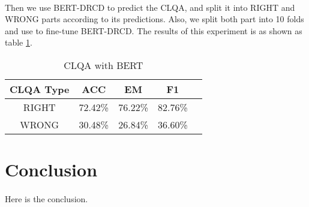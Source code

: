 \documentclass{article}
\begin{document}
\paragraph{}
Then we use BERT-DRCD to predict the CLQA, and split it into RIGHT and WRONG parts according to its predictions. Also, we split both part into 10 folds and use to fine-tune BERT-DRCD. The results of this experiment is as shown as table \ref{tab:bert-clqa-right-wrong}.

\begin{table}[h!]
  \centering
  \caption{CLQA with BERT}
  \begin{tabular}{ccccc}
    CLQA Type & ACC & EM & F1\\
    \toprule
    RIGHT & 72.42\% & 76.22\% & 82.76\% \\
    WRONG & 30.48\% & 26.84\% & 36.60\% \\
  \end{tabular}
  \label{tab:bert-clqa-right-wrong}
\end{table}

\section{Conclusion}
\paragraph{}
Here is the conclusion.



\end{document}
